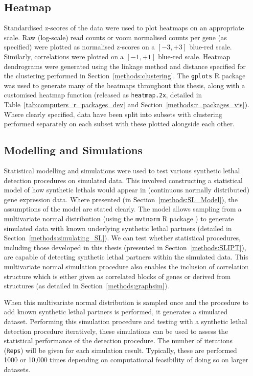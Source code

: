 \subsection{Heatmap} \label{methods:heatmap}
Standardised z-scores of the data were used to plot heatmaps on an appropriate scale. Raw (log-scale) read counts or voom normalised counts per gene (as specified) were plotted  as normalised z-scores on a $[-3,+3]$ blue-red scale. Similarly, correlations were plotted on a $[-1,+1]$ blue-red scale. Heatmap dendrograms were generated using the linkage method and distance specified for the clustering performed in Section~\ref{methods:clustering}. The \texttt{gplots} R package \citep{gplots} was used to generate many of the heatmaps throughout this thesis, along with a customised heatmap function (released as \texttt{heatmap.2x}, detailed in Table~\ref{tab:computers_r_packages_dev} and Section~\ref{methods:r_packages_vis}). Where clearly specified, data have been split into subsets with clustering performed separately on each subset with these plotted alongside each other.

\subsection{Modelling and Simulations} \label{methods:simulation}
Statistical modelling and simulations were used to test various \gls{synthetic lethal} detection procedures on simulated data. This involved constructing a statistical model of how \glspl{synthetic lethal} would appear in (continuous normally distributed) \gls{gene expression} data. Where presented (in Section~\ref{methods:SL_Model}), the assumptions of the model are stated clearly. The model allows sampling from a multivariate normal distribution (using the \texttt{mvtnorm} R package \citep{Genz2009, mvtnorm}) to generate simulated data with known underlying \gls{synthetic lethal} partners (detailed in Section~\ref{methods:simulating_SL}). We can test whether statistical procedures, including those developed in this thesis (presented in Section~\ref{methods:SLIPT}), are capable of detecting \gls{synthetic lethal} partners within the simulated data. This multivariate normal simulation procedure also enables the inclusion of correlation structure which is either given as correlated blocks of genes or derived from  structures (as detailed in Section~\ref{methods:graphsim}).

When this multivariate normal distribution is sampled once and the procedure to add known \gls{synthetic lethal} partners is performed, it generates a simulated dataset. Performing this simulation procedure and testing with a \gls{synthetic lethal} detection procedure iteratively, these simulations can be used to assess the statistical performance of the detection procedure. The number of iterations (\texttt{Reps}) will be given for each simulation result. Typically, these are performed 1000 or 10,000 times depending on computational feasibility of doing so on larger datasets. 

